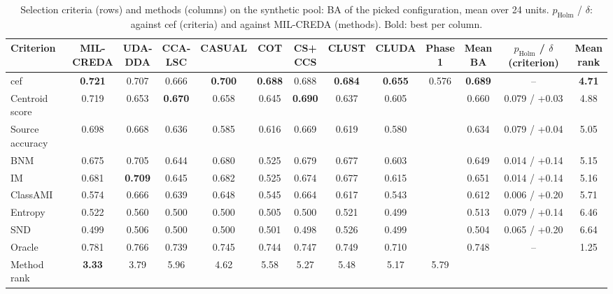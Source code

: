\begin{table}[!t]
\centering
\footnotesize
\caption{Selection criteria (rows) and methods (columns) on the synthetic pool: BA of the picked configuration, mean over 24 units. $p_{\mathrm{Holm}}$ / $\delta$: against cef (criteria) and against MIL-CREDA (methods). Bold: best per column.}
\label{tab:selection-dev}
\setlength{\tabcolsep}{1.5pt}
\begin{tabular*}{\linewidth}{@{\extracolsep{\fill}}lcccccccccccc}
\toprule
Criterion & \shortstack{MIL-\\CREDA} & \shortstack{UDA-\\DDA} & \shortstack{CCA-\\LSC} & CASUAL & COT & \shortstack{CS+\\CCS} & CLUST & CLUDA & \shortstack{Phase\\1} & \shortstack{Mean\\BA} & \shortstack{$p_{\mathrm{Holm}}$ / $\delta$\\(criterion)} & \shortstack{Mean\\rank} \\
\midrule
cef & \textbf{0.721} & 0.707 & 0.666 & \textbf{0.700} & \textbf{0.688} & 0.688 & \textbf{0.684} & \textbf{0.655} & 0.576 & \textbf{0.689} & -- & \textbf{4.71} \\
Centroid score & 0.719 & 0.653 & \textbf{0.670} & 0.658 & 0.645 & \textbf{0.690} & 0.637 & 0.605 &  & 0.660 & 0.079 / +0.03 & 4.88 \\
Source accuracy & 0.698 & 0.668 & 0.636 & 0.585 & 0.616 & 0.669 & 0.619 & 0.580 &  & 0.634 & 0.079 / +0.04 & 5.05 \\
BNM & 0.675 & 0.705 & 0.644 & 0.680 & 0.525 & 0.679 & 0.677 & 0.603 &  & 0.649 & 0.014 / +0.14 & 5.15 \\
IM & 0.681 & \textbf{0.709} & 0.645 & 0.682 & 0.525 & 0.674 & 0.677 & 0.615 &  & 0.651 & 0.014 / +0.14 & 5.16 \\
ClassAMI & 0.574 & 0.666 & 0.639 & 0.648 & 0.545 & 0.664 & 0.617 & 0.543 &  & 0.612 & 0.006 / +0.20 & 5.71 \\
Entropy & 0.522 & 0.560 & 0.500 & 0.500 & 0.505 & 0.500 & 0.521 & 0.499 &  & 0.513 & 0.079 / +0.14 & 6.46 \\
SND & 0.499 & 0.506 & 0.500 & 0.500 & 0.501 & 0.498 & 0.526 & 0.499 &  & 0.504 & 0.065 / +0.20 & 6.64 \\
\midrule
Oracle & 0.781 & 0.766 & 0.739 & 0.745 & 0.744 & 0.747 & 0.749 & 0.710 &  & 0.748 & -- & 1.25 \\
\midrule
Method rank & \textbf{3.33} & 3.79 & 5.96 & 4.62 & 5.58 & 5.27 & 5.48 & 5.17 & 5.79 &  &  &  \\

\end{tabular*}
\end{table}
